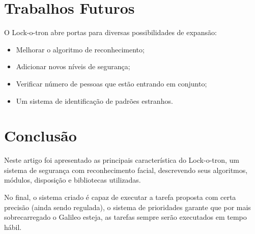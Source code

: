 \documentclass[12pt]{article}
\begin{document}

\section{Trabalhos Futuros}
    O Lock-o-tron abre portas para diversas possibilidades de expansão:
    \begin{itemize}
        \item Melhorar o algoritmo de reconhecimento;
        \item Adicionar novos níveis de segurança;
        \item Verificar número de pessoas que estão entrando em conjunto;
        \item Um sistema de identificação de padrões estranhos.
    \end{itemize}

\section{Conclusão}
    Neste artigo foi apresentado as principais característica do Lock-o-tron, um
    sistema de segurança com reconhecimento facial, descrevendo seus algoritmos,
    módulos, disposição e bibliotecas utilizadas.

    No final, o sistema criado é capaz de executar a tarefa proposta com certa
    precisão (ainda sendo regulada), o sistema de prioridades garante que por
    mais sobrecarregado o Galileo esteja, as tarefas sempre serão executados em
    tempo hábil.



\end{document}
